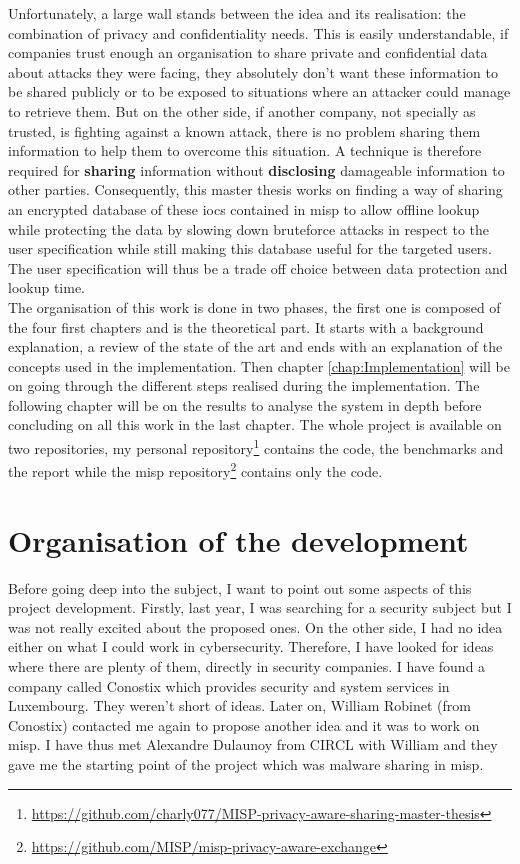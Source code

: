 \documentclass{eplmastersthesis}
\begin{document}
Unfortunately, a large wall stands between the idea and its realisation: the combination of privacy and confidentiality needs. This is easily understandable, if companies trust enough an organisation to share private and confidential data about attacks they were facing, they absolutely don't want these information to be shared publicly or to be exposed to situations where an attacker could manage to retrieve them. But on the other side, if another company, not specially as trusted, is fighting against a known attack, there is no problem sharing them information to help them to overcome this situation. A technique is therefore required for \textbf{sharing} information without \textbf{disclosing} damageable information to other parties. Consequently, this master thesis works on finding a way of sharing an encrypted database of these \glspl{ioc} contained in \gls{misp} to allow offline lookup while protecting the data by slowing down bruteforce attacks in respect to the user specification while still making this database useful for the targeted users. The user specification will thus be a trade off choice between data protection and lookup time.\\

The organisation of this work is done in two phases, the first one is composed of the four first chapters and is the theoretical part. It starts with a background explanation, a review of the state of the art and ends with an explanation of the concepts used in the implementation. Then chapter \ref{chap:Implementation} will be on going through the different steps realised during the implementation. The following chapter will be on the results to analyse the system in depth before concluding on all this work in the last chapter. The whole project is available on two repositories, my personal repository\footnote{\url{https://github.com/charly077/MISP-privacy-aware-sharing-master-thesis}} contains the code, the benchmarks and the report while the \gls{misp} repository\footnote{\url{https://github.com/MISP/misp-privacy-aware-exchange}} contains only the code.

\section{Organisation of the development}
Before going deep into the subject, I want to point out some aspects of this project development.
Firstly, last year, I was searching for a security subject but I was not really excited about the proposed ones. On the other side, I had no idea either on what I could work in cybersecurity. Therefore, I have looked for ideas where there are plenty of them, directly in security companies.
I have found a company called Conostix which provides security and system services in Luxembourg.
They weren't short of ideas. Later on, William Robinet (from Conostix) contacted me again to propose another idea and it was to work on \gls{misp}. I have thus met Alexandre Dulaunoy from CIRCL with William and they gave me the starting point of the project which was malware sharing in \gls{misp}.\\
\end{document}
